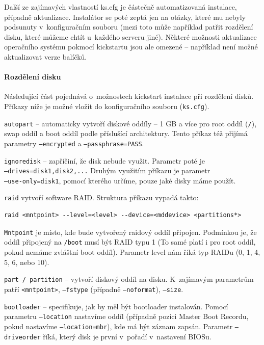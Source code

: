 Další ze zajímavých vlastností ks.cfg je částečně automatizovaná instalace, případně aktualizace. Instalátor se poté zeptá jen na otázky, které mu nebyly podsunuty v~konfiguračním souboru (mezi toto může například patřit rozdělení disku, které můžeme chtít u~každého serveru jiné). Některé možnosti aktualizace operačního systému pokmocí kickstartu jsou ale omezené -- například není možné aktualizovat verze balíčků.


\paragraph{Rozdělení disku}

Následující část pojednává o~možnostech kickstart instalace při rozdělení disků. Příkazy níže je možné vložit do konfiguračního souboru (\texttt{ks.cfg}).

\texttt{autopart} -- automaticky vytvoří diskové oddíly -- 1 GB a více pro root oddíl (\texttt{/}), swap oddíl a boot oddíl podle příslušící architektury. Tento příkaz též přijímá parametry \texttt{--encrypted} a \texttt{--passphrase=PASS}.

\texttt{ignoredisk} -- zapříčiní, že disk nebude využit. Parametr poté je\\ \texttt{--drives=disk1,disk2,...} Druhým využitím příkazu je parametr\\ \texttt{--use-only=disk1}, pomocí kterého určíme, pouze jaké disky máme použít.

\texttt{raid} vytvoří software RAID. Struktura příkazu vypadá takto:
\begin{verbatim}
raid <mntpoint> --level=<level> --device=<mddevice> <partitions*>
\end{verbatim}

\texttt{Mntpoint} je místo, kde bude vytvořený raidový oddíl připojen. Podmínkou je, že oddíl připojený na \texttt{/boot} musí být RAID typu 1 (To samé platí i pro root oddíl, pokud nemáme zvláštní boot oddíl). Parametr level nám říká typ RAIDu  (0, 1, 4, 5, 6, nebo 10).

\texttt{part / partition} -- vytvoří diskový oddíl na disku. K~zajímavým parametrům patří \texttt{<mntpoint>}, \texttt{--fstype} (případně \texttt{--noformat}), \texttt{--size}.

\texttt{bootloader} -- specifikuje, jak by měl být bootloader instalován. Pomocí parametru \texttt{--location} nastavíme oddíl (případně pozici Master Boot Recordu, pokud nastavíme \texttt{--location=mbr}), kde má být záznam zapsán. Parametr \texttt{--driveorder} říká, který disk je první v~pořadí v~nastavení BIOSu.

